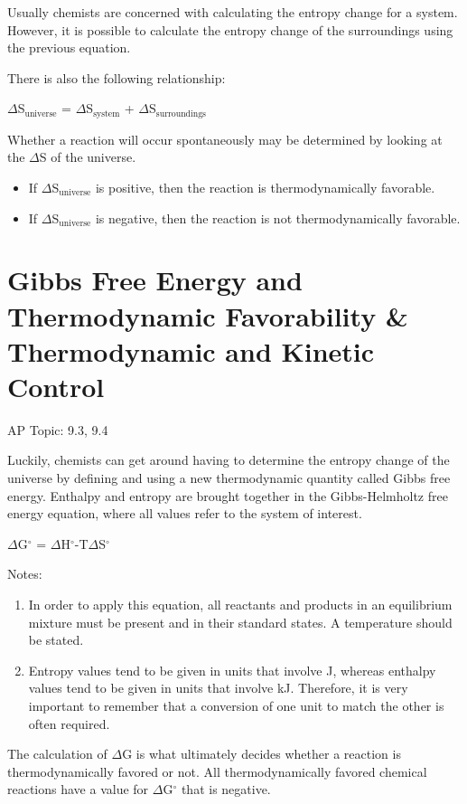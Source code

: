 \documentclass[../chem.tex]{subfiles}
\begin{document}
Usually chemists are concerned with calculating the entropy change for a system. However, it is possible to calculate the entropy change of the surroundings using the previous equation.

There is also the following relationship:
\begin{center}
    $\Delta$S$_{\text{universe}}$ = $\Delta$S$_{\text{system}}$ + $\Delta$S$_{\text{surroundings}}$
\end{center}

Whether a reaction will occur spontaneously may be determined by looking at the $\Delta$S of the universe.
\begin{itemize}
    \item If $\Delta$S$_{\text{universe}}$ is positive, then the reaction is thermodynamically favorable.
    \item If $\Delta$S$_{\text{universe}}$ is negative, then the reaction is not thermodynamically favorable.
\end{itemize}
\section{Gibbs Free Energy and Thermodynamic Favorability \& Thermodynamic and Kinetic Control}
AP Topic: 9.3, 9.4

Luckily, chemists can get around having to determine the entropy change of the universe by defining and using a new thermodynamic quantity 
called Gibbs free energy. Enthalpy and entropy are brought together in the Gibbs-Helmholtz free energy equation, where all values refer to the system of interest.
\begin{center}
    $\Delta$G$^{\circ}$ = $\Delta$H$^{\circ}$-T$\Delta$S$^{\circ}$
\end{center}

Notes:
\begin{enumerate}
    \item In order to apply this equation, all reactants and products in an equilibrium mixture must be present and in their standard states. A temperature should be stated.
    \item Entropy values tend to be given in units that involve J, whereas enthalpy values tend to be given in units that involve kJ. Therefore, it is very important to remember that a conversion of one unit to match the other is often required.
\end{enumerate}

The calculation of $\Delta$G is what ultimately decides whether a reaction is thermodynamically favored or not. All thermodynamically favored 
chemical reactions have a value for $\Delta$G$^{\circ}$ that is negative. 
\end{document}
